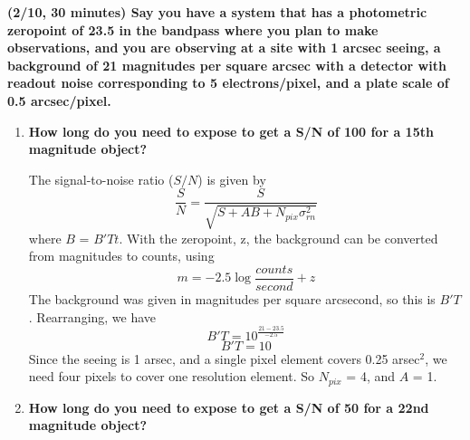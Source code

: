 \documentclass[12pt]{article}
\begin{document}
\textbf{(2/10, 30 minutes) Say you have a system that has a
photometric zeropoint of 23.5 in the bandpass where you plan to make
observations, and you are observing at a site with 1 arcsec seeing, a
background of 21 magnitudes per square arcsec with a detector with
readout noise corresponding to 5 electrons/pixel, and a plate scale of
0.5 arcsec/pixel.}
\begin{enumerate}
    \item \textbf{How long do you need to expose to get a S/N of 100 for a
        15th magnitude object?}

    The signal-to-noise ratio ($S/N$) is given by
    $$ \frac{S}{N} = \frac{S}{\sqrt{S+AB+N_{pix}\sigma_{rn}^2}} $$
    where $B$ = $B'Tt$. With the zeropoint, z, the background can be
    converted from magnitudes to counts, using
    $$ m = -2.5\log\frac{counts}{second} + z $$
    The background was given in magnitudes per square arcsecond, so
    this is $B'T$. Rearranging, we have
    $$ B'T = 10^{\frac{21-23.5}{-2.5}} $$
    $$ B'T = 10 $$
    Since the seeing is 1 arsec, and a single pixel element covers 0.25
    arsec$^2$, we need four pixels to cover one resolution element.
    So $N_{pix}$ = 4, and $A$ = 1.


\item \textbf{How long do you need to expose to get a S/N of 50 for a 22nd
    magnitude object?}
\end{enumerate}
\end{document}
